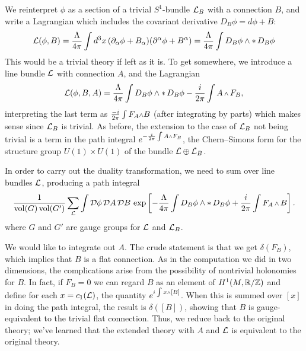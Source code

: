 We reinterpret $\phi$ as a section of a trivial $S^1$-bundle ${\cal L}_B$ with a
connection
$B$, and write a Lagrangian which includes the covariant derivative
$D_B\phi=d\phi+B$:
\begin{equation}
{\cal L}(\phi,B)=\frac{\Lambda}{4\pi}\int d^3x\,
(\partial_\alpha\phi+B_\alpha)(\partial^\alpha\phi+B^\alpha)
=\frac{\Lambda}{4\pi}\int D_B\phi\wedge\mathop{*} D_B\phi
\end{equation}
This would be a trivial theory if left as it is.  To get somewhere, we
introduce
a line bundle ${\cal L}$ with connection $A$, and the Lagrangian
\begin{equation}
\lg(\phi,B,A)=\frac{\Lambda}{4\pi}\int D_B\phi\wedge\hstar D_B\phi
-\frac{i}{2\pi}\int A\wdg F_B,
\end{equation}
interpreting the last term as $\frac{-i}{2\pi}\int F_A\wdg B$ (after
integrating
by parts) which makes sense since  ${\cal L}_B$ is trivial.
As before, the extension to the case of ${\cal L}_B$ not being trivial is a term in
the
path integral
$e^{-\frac{i}{2\pi}\int A\wdg F_B}$,
the Chern--Simons form for the structure
group $U(1)\times U(1)$ of the bundle
${\cal L}\oplus {\cal L}_B$.

In order to carry out the duality transformation, we need to sum over line
bundles ${\cal L}$, producing a path integral
\begin{equation}
\frac1{\vol(G)\vol(G')}\sum_{\lb}\int\cD\phi\,\cD A\,\cD B\,
\exp\left[-\frac{\Lambda}{4\pi}\int D_B\phi\wedge\hstar D_B\phi
+ \frac{i}{2\pi}\int F_A\wdg B\right].
\end{equation}
where $G$ and $G'$ are gauge groups for ${\cal L}$ and ${\cal L}_B$.

We would like to integrate out $A$.  The crude statement is that we get
$\delta(F_B)$,
which implies that $B$ is a flat connection.  As in the computation we
did in two dimensions, the complications arise from
the possibility of nontrivial holonomies for $B$.
In fact, if $F_B=0$ we can regard $B$ as an element of $H^1(M,{\Bbb R}/{\Bbb Z})$ and
define for each $x=c_1({\cal L})$, the quantity
$e^{i\int x\wdg [B]}$.  When this is summed over $[x]$
in doing the path integral,  the result is $\delta([B])$, showing that
$B$ is gauge-equivalent to the trivial flat connection.
Thus, we reduce back to the original theory;
we've learned that the extended theory with $A$ and ${\cal L}$ is equivalent
to the original theory.


